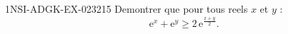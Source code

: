 \begin{exercice}{1NSI-ADGK-EX-023}{2}{15}
Demontrer que pour tous reels $x$ et $y$ :
\[ \mathrm{e}^x + \mathrm{e}^y \geq 2\,\mathrm{e}^{\frac{x+y}{2}}. \]

\end{exercice}
